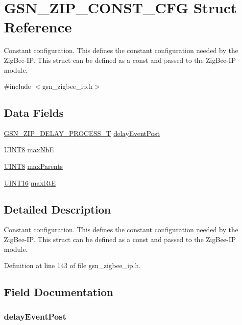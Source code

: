 \hypertarget{a00439}{
\section{GSN\_\-ZIP\_\-CONST\_\-CFG Struct Reference}
\label{a00439}
}


Constant configuration. This defines the constant configuration needed by the ZigBee-\/IP. This struct can be defined as a const and passed to the ZigBee-\/IP module.  




{\ttfamily \#include $<$gsn\_\-zigbee\_\-ip.h$>$}

\subsection*{Data Fields}
\begin{DoxyCompactItemize}
\item 
\hyperlink{a00618_a7f63a0d767866fd213452687d2666c67}{GSN\_\-ZIP\_\-DELAY\_\-PROCESS\_\-T} \hyperlink{a00439_a29e4d6bffd311d693fce3191c592236c}{delayEventPost}
\item 
\hyperlink{a00660_gab27e9918b538ce9d8ca692479b375b6a}{UINT8} \hyperlink{a00439_aa73cd58c7ca4193dbe7db30eadec7f36}{maxNbE}
\item 
\hyperlink{a00660_gab27e9918b538ce9d8ca692479b375b6a}{UINT8} \hyperlink{a00439_a217c1178e6237268b2ebafe5ce2fbd50}{maxParents}
\item 
\hyperlink{a00660_ga09f1a1fb2293e33483cc8d44aefb1eb1}{UINT16} \hyperlink{a00439_a17ffd82e8cd233649b9a6a7f3477ebf9}{maxRtE}
\end{DoxyCompactItemize}


\subsection{Detailed Description}
Constant configuration. This defines the constant configuration needed by the ZigBee-\/IP. This struct can be defined as a const and passed to the ZigBee-\/IP module. 

Definition at line 143 of file gsn\_\-zigbee\_\-ip.h.



\subsection{Field Documentation}
\hypertarget{a00439_a29e4d6bffd311d693fce3191c592236c}{
\subsubsection[{delayEventPost}]{ {\bf delayEventPost}}}
\label{a00439_a29e4d6bffd311d693fce3191c592236c}


